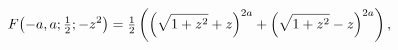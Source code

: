 \[\mathop{F\/}\nolimits\!\left(-a,a;\tfrac{1}{2};-z^{2}\right)=\tfrac{1}{2}\left%
(\left(\sqrt{1+z^{2}}+z\right)^{2a}+\left(\sqrt{1+z^{2}}-z\right)^{2a}\right),\]